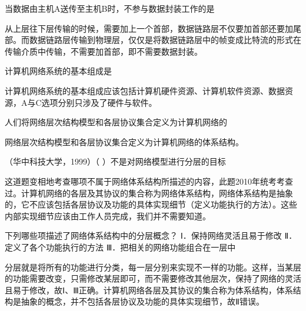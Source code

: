 \question 当数据由主机A送传至主机B时，不参与数据封装工作的是
\par{}
\begin{solution}从上层往下层传输的时候，需要加上一个首部，数据链路层不仅要加首部还要加尾部。而数据链路层传输到物理层，仅仅是将数据链路层中的帧变成比特流的形式在传输介质中传输，不需要加首部，即不需要数据封装。
\end{solution}
\question 计算机网络系统的基本组成是
\par{}
\begin{solution}计算机网络系统的基本组成应该包括计算机硬件资源、计算机软件资源、数据资源，A与C选项分别只涉及了硬件与软件。
\end{solution}
\question 人们将网络层次结构模型和各层协议集合定义为计算机网络的
\par{}
\begin{solution}网络层次结构模型和各层协议集合定义为计算机网络的体系结构。
\end{solution}
\question （华中科技大学，1999）（ ）不是对网络模型进行分层的目标
\par{}
\begin{solution}这道题变相地考查哪项不属于网络体系结构所描述的内容，此题2010年统考考查过。计算机网络的各层及其协议的集合称为网络体系结构，网络体系结构是抽象的，它不应该包括各层协议及功能的具体实现细节（定义功能执行的方法）。这些内部实现细节应该由工作人员完成，我们并不需要知道。
\end{solution}
\question 下列哪些项描述了网络体系结构中的分层概念？ Ⅰ．保持网络灵活且易于修改
Ⅱ．定义了各个功能执行的方法 Ⅲ．把相关的网络功能组合在一层中
\par{}
\begin{solution}分层就是将所有的功能进行分类，每一层分别来实现不一样的功能。这样，当某层的功能需要改变，只需修改某层即可，而不需要修改其他层次，保持了网络的灵活且易于修改，故Ⅰ、Ⅲ正确。计算机网络各层及其协议的集合称为体系结构，体系结构是抽象的概念，并不包括各层协议及功能的具体实现细节，故Ⅱ错误。
\end{solution}
